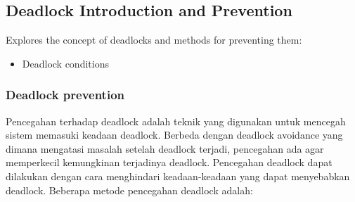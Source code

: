 \documentclass[12pt]{article}
\begin{document}
\subsection{Deadlock Introduction and Prevention}
Explores the concept of deadlocks and methods for preventing them:
\begin{itemize}
    \item Deadlock conditions
\end{itemize}
\subsubsection{Deadlock prevention}

\hspace{1cm} Pencegahan terhadap deadlock adalah teknik yang digunakan untuk mencegah sistem memasuki keadaan deadlock.
Berbeda dengan deadlock avoidance yang dimana mengatasi masalah setelah deadlock terjadi, pencegahan ada agar memperkecil
kemungkinan terjadinya deadlock. Pencegahan deadlock dapat dilakukan dengan cara menghindari keadaan-keadaan yang dapat menyebabkan deadlock.
Beberapa metode pencegahan deadlock adalah:
\end{document}
